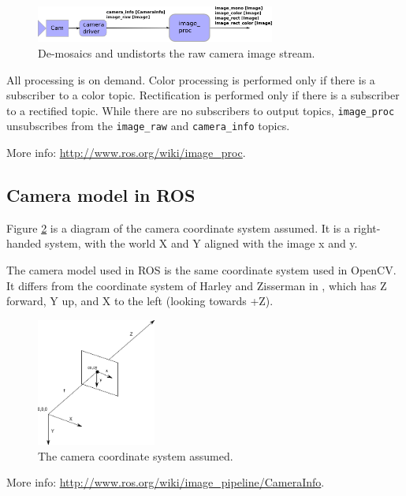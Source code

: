 \begin{figure}[!htbp]
 \centering
 \includegraphics[width=0.7\textwidth]{images/img_proc02.png}
 \caption{De-mosaics and undistorts the raw camera image stream.}
 \label{fig:img_proc02}
\end{figure}

All processing is on demand. Color processing is performed only if there is a subscriber to a color topic. Rectification is performed only if there is a subscriber to a rectified topic. While there are no subscribers to output topics, \texttt{image\_proc} unsubscribes from the \texttt{image\_raw} and \texttt{camera\_info} topics.

More info: \url{http://www.ros.org/wiki/image_proc}.


\subsection{Camera model in ROS}

Figure \ref{fig:camera_model02} is a diagram of the camera coordinate system assumed. It is a right-handed system, with the world X and Y aligned with the image x and y.

The camera model used in ROS is the same coordinate system used in OpenCV. It differs from the coordinate system of Harley and Zisserman in \cite{HZ2}, which has Z forward, Y up, and X to the left (looking towards +Z).

\begin{figure}[!htbp]
 \centering
 \includegraphics[width=0.35\textwidth]{images/camera_model02.png}
 \caption{The camera coordinate system assumed.}
 \label{fig:camera_model02}
\end{figure}

More info: \url{http://www.ros.org/wiki/image_pipeline/CameraInfo}.

